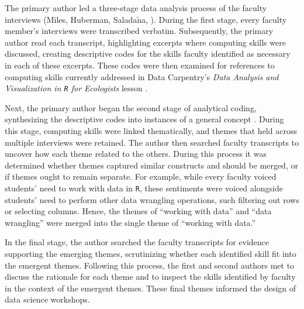 \documentclass[12pt]{article}
\begin{document}


\quad The primary author led a three-stage data analysis process of the faculty
interviews (Miles, Huberman, Salada$\tilde{\text{n}}$a, \citeyear{miles}). 
During the first stage, every faculty member's interviews were transcribed
verbatim. Subsequently, the primary author read each transcript, highlighting
excerpts where computing skills were discussed, creating descriptive codes for
the skills faculty identified as necessary in each of these excerpts. These
codes were then examined for references to computing
skills currently addressed in Data Carpentry's \emph{Data Analysis and
Visualization in \texttt{R} for Ecologists} lesson \citep{ecology_curriculum}. 

\quad Next, the primary author began the second stage of analytical coding,
synthesizing the descriptive codes into instances of a general concept 
\citep[p.\ 95]{miles}. During this stage, computing skills were linked
thematically, and themes that held across multiple interviews were retained.
The author then searched faculty transcripts to uncover how each theme related
to the others. During this process it was determined whether themes captured
similar constructs and should be merged, or if themes ought to remain separate. 
For example, while every faculty voiced students' need to work with data in 
\texttt{R}, these sentiments were voiced alongside students' need to perform
other data wrangling operations, such filtering out rows or selecting columns. 
Hence, the themes of ``working with data'' and ``data wrangling'' were merged
into the single theme of ``working with data.'' 


\quad In the final stage, the author searched the faculty transcripts for
evidence supporting the emerging themes, scrutinizing whether each identified
skill fit into the emergent themes. Following this process, the first and second
authors met to discuss the rationale for each theme and to inspect the skills
identified by faculty in the context of the emergent themes. These final themes
informed the design of data science workshops. 
\end{document}
